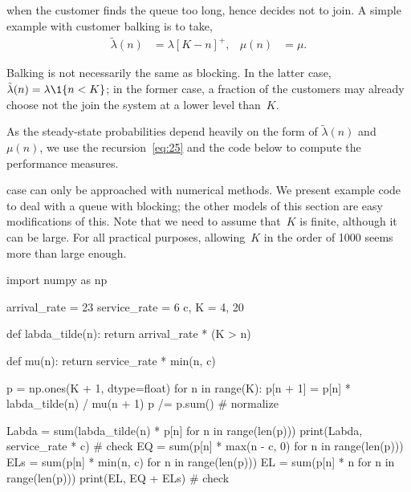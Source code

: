 \documentclass[stochastic-or.tex]{subfiles}
\begin{document}

 when the customer finds the queue too long, hence decides not to join.
A simple example with customer balking is to take,
 \begin{align*}
\tilde \lambda(n) &= \lambda [K-n]^{+}, &  \mu(n)&=\mu.
\end{align*}

Balking is not necessarily the same as blocking.
In the latter case, $\tilde \lambda(n)= \lambda \1{n < K}$; in the former case, a fraction of the customers may already choose not the join the system at a lower level than~$K$.

As the steady-state probabilities depend heavily on the form of $\tilde \lambda(n)$ and $\mu(n)$, we use the recursion~\cref{eq:25} and the code below to compute the performance measures.


 case can only be approached with numerical methods.
We present example code to deal with a queue with blocking; the other models of this section are easy modifications of this.
Note that we need to assume that~$K$ is finite, although it can be large. For all practical purposes, allowing~$K$ in the order of 1000 seems more than large enough.

\begin{python}
import numpy as np

arrival_rate = 23
service_rate = 6
c, K = 4, 20


def labda_tilde(n):
    return arrival_rate * (K > n)


def mu(n):
    return service_rate * min(n, c)


p = np.ones(K + 1, dtype=float)
for n in range(K):
    p[n + 1] = p[n] * labda_tilde(n) / mu(n + 1)
p /= p.sum()  # normalize

Labda = sum(labda_tilde(n) * p[n] for n in range(len(p)))
print(Labda, service_rate * c) # check
EQ = sum(p[n] * max(n - c, 0) for n in range(len(p)))
ELs = sum(p[n] * min(n, c) for n in range(len(p)))
EL = sum(p[n] * n for n in range(len(p)))
print(EL, EQ + ELs) # check
\end{python}
\end{document}
